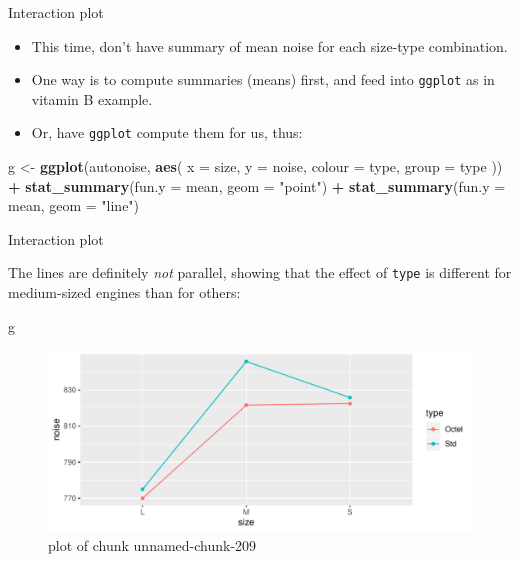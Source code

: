 \documentclass[ignorenonframetext,]{beamer}
\newenvironment{Shaded}{\begin{snugshade}}{\end{snugshade}}
\newcommand{\DataTypeTok}[1]{\textcolor[rgb]{0.13,0.29,0.53}{#1}}
\newcommand{\KeywordTok}[1]{\textcolor[rgb]{0.13,0.29,0.53}{\textbf{#1}}}
\newcommand{\NormalTok}[1]{#1}
\newcommand{\OperatorTok}[1]{\textcolor[rgb]{0.81,0.36,0.00}{\textbf{#1}}}
\newcommand{\StringTok}[1]{\textcolor[rgb]{0.31,0.60,0.02}{#1}}
\begin{document}
\begin{frame}[fragile]{Interaction plot}
\protect\hypertarget{interaction-plot-1}{}

\begin{itemize}
\item
  This time, don't have summary of mean noise for each size-type
  combination.
\item
  One way is to compute summaries (means) first, and feed into
  \texttt{ggplot} as in vitamin B example.
\item
  Or, have \texttt{ggplot} compute them for us, thus:
\end{itemize}

\begin{Shaded}
\begin{Highlighting}[]
\NormalTok{g <-}\StringTok{ }\KeywordTok{ggplot}\NormalTok{(autonoise, }\KeywordTok{aes}\NormalTok{(}
  \DataTypeTok{x =}\NormalTok{ size, }\DataTypeTok{y =}\NormalTok{ noise,}
  \DataTypeTok{colour =}\NormalTok{ type, }\DataTypeTok{group =}\NormalTok{ type}
\NormalTok{)) }\OperatorTok{+}
\StringTok{  }\KeywordTok{stat_summary}\NormalTok{(}\DataTypeTok{fun.y =}\NormalTok{ mean, }\DataTypeTok{geom =} \StringTok{"point"}\NormalTok{) }\OperatorTok{+}
\StringTok{  }\KeywordTok{stat_summary}\NormalTok{(}\DataTypeTok{fun.y =}\NormalTok{ mean, }\DataTypeTok{geom =} \StringTok{"line"}\NormalTok{)}
\end{Highlighting}
\end{Shaded}

\end{frame}

\begin{frame}[fragile]{Interaction plot}
\protect\hypertarget{interaction-plot-2}{}

The lines are definitely \emph{not} parallel, showing that the effect of
\texttt{type} is different for medium-sized engines than for others:

\begin{Shaded}
\begin{Highlighting}[]
\NormalTok{g}
\end{Highlighting}
\end{Shaded}

\begin{figure}
\centering
\includegraphics{figure/unnamed-chunk-209-1.pdf}
\caption{plot of chunk unnamed-chunk-209}
\end{figure}

\end{frame}
\end{document}
